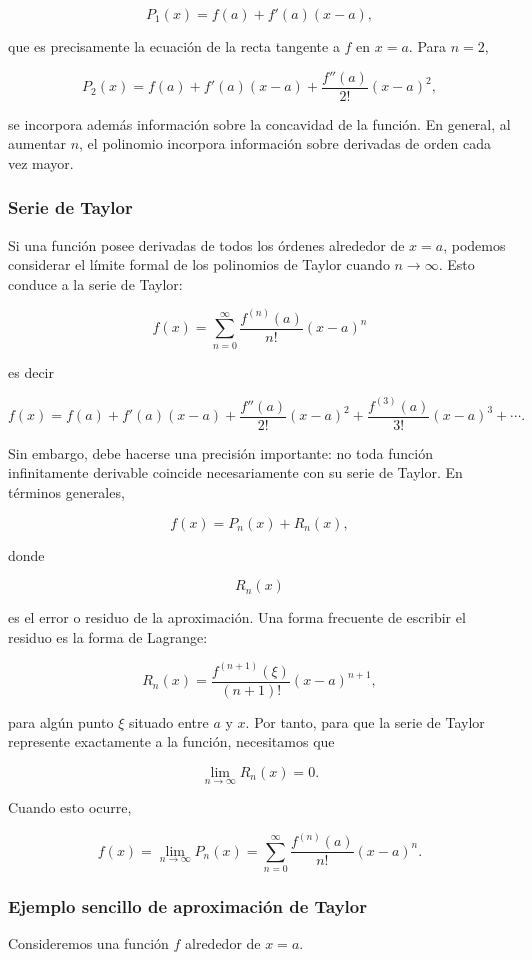 \documentclass[12pt]{article}
\begin{document}
\[P_1(x)=f(a)+f'(a)(x-a),\]

que es precisamente la ecuación de la recta tangente a \(f\) en \(x=a\). Para \(n=2\),

\[P_2(x)=f(a)+f'(a)(x-a)+\frac{f''(a)}{2!}(x-a)^2,\]

se incorpora además información sobre la concavidad de la función. En general, al aumentar \(n\), el polinomio incorpora información sobre derivadas de orden cada vez mayor.
\subsubsection*{Serie de Taylor}
Si una función posee derivadas de todos los órdenes alrededor de \(x=a\), podemos considerar el límite formal de los polinomios de Taylor cuando \(n\to\infty\). Esto conduce a la serie de Taylor:

\[\boxed{f(x)=\sum_{n=0}^{\infty}\frac{f^{(n)}(a)}{n!}(x-a)^n}\]

es decir

\[\boxed{f(x)=f(a)+f'(a)(x-a)+\frac{f''(a)}{2!}(x-a)^2+\frac{f^{(3)}(a)}{3!}(x-a)^3+\cdots.}\]

Sin embargo, debe hacerse una precisión importante: no toda función
infinitamente derivable coincide necesariamente con su serie de Taylor. En términos generales,

\[f(x)=P_n(x)+R_n(x),\]

donde

\[R_n(x)\]

es el error o residuo de la aproximación. Una forma frecuente de escribir el residuo es la forma de Lagrange:

\[\boxed{R_n(x)=\frac{f^{(n+1)}(\xi)}{(n+1)!}(x-a)^{n+1},}\]

para algún punto \(\xi\) situado entre \(a\) y \(x\). Por tanto, para que la serie de Taylor represente exactamente a la
función, necesitamos que

\[\boxed{\lim_{n\to\infty}R_n(x)=0.}\]

Cuando esto ocurre,

\[f(x)=\lim_{n\to\infty}P_n(x)=\sum_{n=0}^{\infty}\frac{f^{(n)}(a)}{n!}(x-a)^n.\]
\subsubsection*{Ejemplo sencillo de aproximación de Taylor}
Consideremos una función \(f\) alrededor de \(x=a\).
\end{document}
